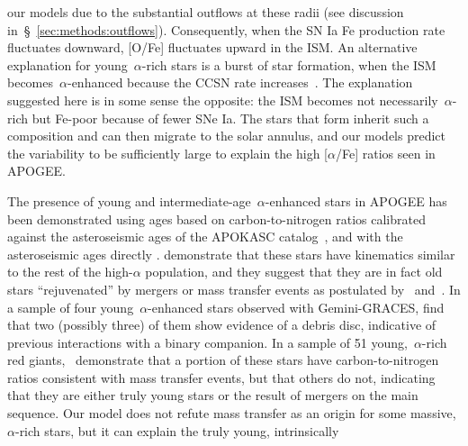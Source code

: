 \documentclass[draft2.tex]{subfiles}
\begin{document}
our models due to the substantial outflows at these radii (see discussion 
in~\S~\ref{sec:methods:outflows}). 
Consequently, when the SN Ia Fe production rate fluctuates downward, [O/Fe] 
fluctuates upward in the ISM. 
An alternative explanation for young~$\alpha$-rich stars is a burst of 
star formation, when the ISM becomes~$\alpha$-enhanced because the CCSN rate 
increases~\citep{Johnson2020}. 
The explanation suggested here is in some sense the opposite: the ISM 
becomes not necessarily~$\alpha$-rich but Fe-poor because of fewer SNe Ia. 
The stars that form inherit such a composition and can then migrate to 
the solar annulus, and our models predict the variability to be sufficiently 
large to explain the high [$\alpha$/Fe] ratios seen in APOGEE. 
\par\null\par 
The presence of young and intermediate-age~$\alpha$-enhanced stars in APOGEE 
has been demonstrated using ages based on carbon-to-nitrogen ratios 
\citep{Martig2016} calibrated against the asteroseismic ages of the APOKASC 
catalog~\citep{Pinsonneault2014}, and with the asteroseismic ages directly 
\citep{Martig2015, Jofre2016, Izzard2018, SilvaAguirre2018}. 
\citet{SilvaAguirre2018} demonstrate that these stars have kinematics similar 
to the rest of the high-$\alpha$ population, and they suggest that they are 
in fact old stars ``rejuvenated'' by mergers or mass transfer events 
as postulated by~\citet{Jofre2016} and~\citet{Izzard2018}. 
In a sample of four young~$\alpha$-enhanced stars observed with Gemini-GRACES, 
\citet{Yong2016} find that two (possibly three) of them show evidence of a 
debris disc, indicative of previous interactions with a binary companion. 
In a sample of 51 young,~$\alpha$-rich red giants,~\citet{Hekker2019} 
demonstrate that a portion of these stars have carbon-to-nitrogen ratios 
consistent with mass transfer events, but that others do not, indicating that 
they are either truly young stars or the result of mergers on the main 
sequence. 
Our model does not refute mass transfer as an origin for some massive, 
$\alpha$-rich stars, but it can explain the truly young, intrinsically 
\end{document}
